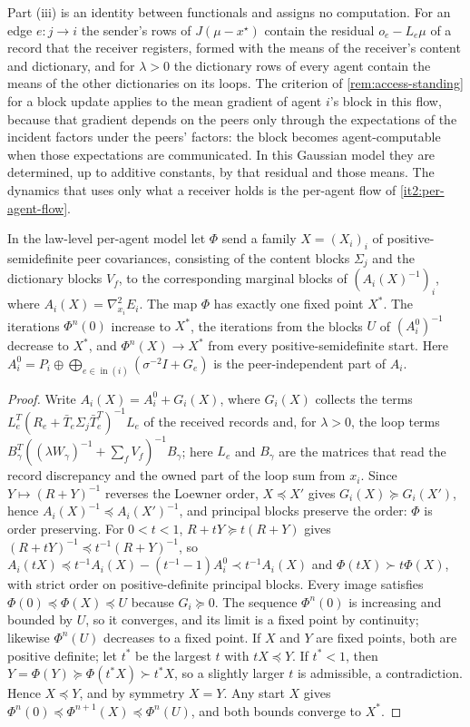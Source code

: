 Part (iii) is an identity between functionals and assigns no computation. For an edge $e:j\to i$ the sender's rows of $J(\mu-x^\star)$ contain the residual $o_e-L_e\mu$ of a record that the receiver registers, formed with the means of the receiver's content and dictionary, and for $\lambda>0$ the dictionary rows of every agent contain the means of the other dictionaries on its loops. The criterion of \cref{rem:access-standing} for a block update applies to the mean gradient of agent $i$'s block in this flow, because that gradient depends on the peers only through the expectations of the incident factors under the peers' factors: the block becomes agent-computable when those expectations are communicated. In this Gaussian model they are determined, up to additive constants, by that residual and those means. The dynamics that uses only what a receiver holds is the per-agent flow of \cref{it2:per-agent-flow}.

In the law-level per-agent model let $\Phi$ send a family $X=(X_i)_i$ of positive-semidefinite peer covariances, consisting of the content blocks $\Sigma_j$ and the dictionary blocks $V_f$, to the corresponding marginal blocks of $(A_i(X)^{-1})_i$, where $A_i(X)=\nabla^2_{x_i}E_i$. The map $\Phi$ has exactly one fixed point $X^*$. The iterations $\Phi^n(0)$ increase to $X^*$, the iterations from the blocks $U$ of $(A_i^0)^{-1}$ decrease to $X^*$, and $\Phi^n(X)\to X^*$ from every positive-semidefinite start. Here $A_i^0=P_i\oplus\bigoplus_{e\in\operatorname{in}(i)}(\sigma^{-2}I+G_e)$ is the peer-independent part of $A_i$.
\begin{proof}
Write $A_i(X)=A_i^0+G_i(X)$, where $G_i(X)$ collects the terms $L_e^T(R_e+\bar T_e\Sigma_j\bar T_e^T)^{-1}L_e$ of the received records and, for $\lambda>0$, the loop terms $B_\gamma^T((\lambda W_\gamma)^{-1}+\sum_fV_f)^{-1}B_\gamma$; here $L_e$ and $B_\gamma$ are the matrices that read the record discrepancy and the owned part of the loop sum from $x_i$. Since $Y\mapsto(R+Y)^{-1}$ reverses the Loewner order, $X\preceq X'$ gives $G_i(X)\succeq G_i(X')$, hence $A_i(X)^{-1}\preceq A_i(X')^{-1}$, and principal blocks preserve the order: $\Phi$ is order preserving. For $0<t<1$, $R+tY\succeq t(R+Y)$ gives $(R+tY)^{-1}\preceq t^{-1}(R+Y)^{-1}$, so $A_i(tX)\preceq t^{-1}A_i(X)-(t^{-1}-1)A_i^0\prec t^{-1}A_i(X)$ and $\Phi(tX)\succ t\Phi(X)$, with strict order on positive-definite principal blocks. Every image satisfies $\Phi(0)\preceq\Phi(X)\preceq U$ because $G_i\succeq0$. The sequence $\Phi^n(0)$ is increasing and bounded by $U$, so it converges, and its limit is a fixed point by continuity; likewise $\Phi^n(U)$ decreases to a fixed point. If $X$ and $Y$ are fixed points, both are positive definite; let $t^*$ be the largest $t$ with $tX\preceq Y$. If $t^*<1$, then $Y=\Phi(Y)\succeq\Phi(t^*X)\succ t^*X$, so a slightly larger $t$ is admissible, a contradiction. Hence $X\preceq Y$, and by symmetry $X=Y$. Any start $X$ gives $\Phi^n(0)\preceq\Phi^{n+1}(X)\preceq\Phi^n(U)$, and both bounds converge to $X^*$.
\end{proof}

